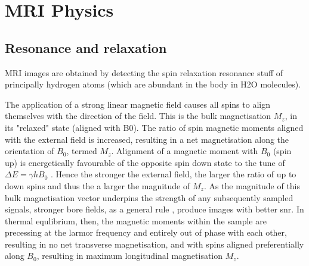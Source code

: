 \section{MRI Physics}

\subsection{Resonance and relaxation}


MRI images are obtained by detecting the spin relaxation resonance stuff of principally hydrogen atoms (which are abundant in the body in H2O molecules).

The application of a strong linear magnetic field causes all spins to align themselves with the direction of the field. This is the bulk magnetisation $M_z$, in its "relaxed" state (aligned with B0).
The ratio of spin magnetic moments aligned with the external field is increased,  resulting in a net magnetisation along the orientation of $B_0$, termed $M_z$.
Alignment of a magnetic moment with $B_0$ (spin up) is energetically favourable of the opposite spin down state to the tune of $\Delta E = \gamma h B_0$ .
Hence the stronger the external field, the larger the ratio of up to down spins and thus the a larger the magnitude of $M_z$.
As the magnitude of this bulk magnetisation vector underpins the strength of any subsequently sampled signals, stronger bore fields, as a general rule , produce images with better \gls{snr}.
In thermal equlibrium, then, the magnetic moments within the sample are precessing at the larmor frequency and entirely out of phase with each other, resulting in no net transverse magnetisation, and with spins aligned preferentially along $B_0$, resulting in maximum longitudinal magnetisation $M_z$.

